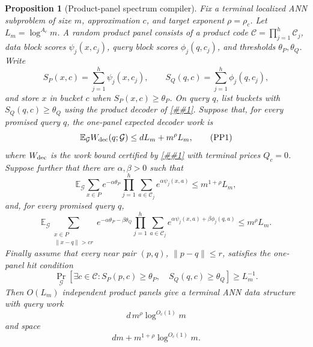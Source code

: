 \documentclass[10pt]{article}
\newcommand{\cref}[1]{\ref{##1}}
\newtheorem{proposition}[theorem]{Proposition}
\theoremstyle{definition}
\newcommand{\E}{\mathbb{E}}
\begin{document}
\begin{proposition}[Product-panel spectrum compiler]
   \label{prop:product-panel-spectrum-compiler}
   Fix a terminal localized ANN subproblem of size \(m\), approximation \(c\),
   and target exponent \(\rho=\rho_c\).  Let \(L_m=\log^{A_c}m\).  A random
   product panel consists of a product code
   \(\mathcal C=\prod_{j=1}^h\mathcal C_j\), data block scores
   \(\psi_j(x,c_j)\), query block scores \(\phi_j(q,c_j)\), and thresholds
   \(\theta_P,\theta_Q\).  Write
   \[
      S_P(x,c)=\sum_{j=1}^h\psi_j(x,c_j),
      \qquad
      S_Q(q,c)=\sum_{j=1}^h\phi_j(q,c_j),
   \]
   and store \(x\) in bucket \(c\) when \(S_P(x,c)\ge\theta_P\).  On query
   \(q\), list buckets with \(S_Q(q,c)\ge\theta_Q\) using the product decoder
   of \cref{lem:additive-product-panel-decoder}.  Suppose that, for every
   promised query \(q\), the one-panel expected decoder work is
   \[
      \E_{\mathcal G}W_{\rm dec}(q;\mathcal G)
      \le dL_m+m^\rho L_m,
      \tag{PP1}
   \]
   where \(W_{\rm dec}\) is the work bound certified by
   \cref{lem:additive-product-panel-decoder} with terminal prices \(Q_c=0\).
   Suppose further that there are \(\alpha,\beta>0\) such that
   \[
      \E_{\mathcal G}
      \sum_{x\in P}
      e^{-\alpha\theta_P}
      \prod_{j=1}^h
      \sum_{a\in\mathcal C_j}e^{\alpha\psi_j(x,a)}
      \le m^{1+\rho}L_m,
      \tag{PP2}
   \]
   and, for every promised query \(q\),
   \[
      \E_{\mathcal G}
      \sum_{\substack{x\in P\\ \|x-q\|>cr}}
      e^{-\alpha\theta_P-\beta\theta_Q}
      \prod_{j=1}^h
      \sum_{a\in\mathcal C_j}
      e^{\alpha\psi_j(x,a)+\beta\phi_j(q,a)}
      \le m^\rho L_m .
      \tag{PP3}
   \]
   Finally assume that every near pair \((p,q)\), \(\|p-q\|\le r\), satisfies
   the one-panel hit condition
   \[
      \Pr_{\mathcal G}\!\left[
         \exists c\in\mathcal C:
         S_P(p,c)\ge\theta_P,\quad S_Q(q,c)\ge\theta_Q
      \right]\ge L_m^{-1}.
      \tag{PP4}
   \]
   Then \(O(L_m)\) independent product panels give a terminal ANN data
   structure with query work
   \[
      d\,m^\rho\log^{O_c(1)}m
   \]
   and space
   \[
      dm+m^{1+\rho}\log^{O_c(1)}m .
   \]
\end{proposition}
\end{document}
